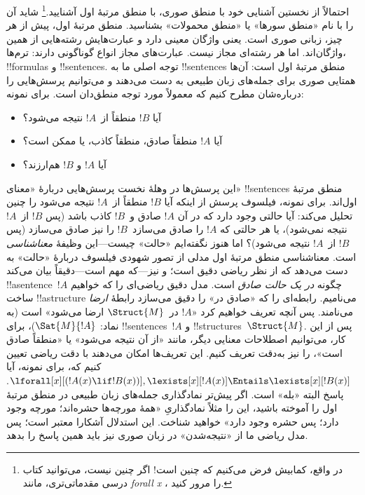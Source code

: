 \documentclass[../../../include/open-logic-section]{subfiles}
\begin{document}


احتمالاً از نخستین آشنایی خود با منطق صوری، با منطق مرتبهٔ اول
آشنایید.\footnote{در واقع، کمابیش فرض می‌کنیم که چنین است!{} اگر چنین
نیست، می‌توانید کتاب درسی مقدماتی‌تری، مانند \emph{forall x}
\citep{Magnus2021}، را مرور کنید.} شاید آن را با نام «منطق سورها» یا
«منطق محمولات» بشناسید. منطق مرتبهٔ اول، پیش از هر چیز، زبانی صوری
است. یعنی واژگان معینی دارد و عبارت‌هایش رشته‌هایی از همین واژگان‌اند.
اما هر رشته‌ای مجاز نیست. عبارت‌های مجاز انواع گوناگونی دارند: ترم‌ها،
!!{formula}s و !!{sentence}s. توجه اصلی ما به !!{sentence}s منطق مرتبهٔ
اول است: آن‌ها همتایی صوری برای جمله‌های زبان طبیعی به دست می‌دهند و
می‌توانیم پرسش‌هایی را درباره‌شان مطرح کنیم که معمولاً مورد توجه منطق‌دان
است. برای نمونه:
\begin{itemize}
    \item آیا $!B$ منطقاً از~$!A$ نتیجه می‌شود؟
    \item آیا $!A$ منطقاً صادق، منطقاً کاذب، یا ممکن است؟
    \item آیا $!A$ و $!B$ هم‌ارزند؟
\end{itemize}

این پرسش‌ها در وهلهٔ نخست پرسش‌هایی دربارهٔ «معنای» !!{sentence}s منطق
مرتبهٔ اول‌اند. برای نمونه، فیلسوف پرسش از اینکه آیا $!B$ منطقاً
از~$!A$ نتیجه می‌شود را چنین تحلیل می‌کند: آیا حالتی وجود دارد که در آن
$!A$ صادق و~$!B$ کاذب باشد (پس $!B$ از~$!A$ نتیجه نمی‌شود)، یا هر حالتی
که $!A$ را صادق می‌سازد~$!B$ را نیز صادق می‌سازد (پس $!B$ از~$!A$
نتیجه می‌شود)؟ اما هنوز نگفته‌ایم «حالت» چیست---این وظیفهٔ
\emph{معناشناسی} است. معناشناسی منطق مرتبهٔ اول مدلی از تصور شهودی
فیلسوف دربارهٔ «حالت» به دست می‌دهد که از نظر ریاضی دقیق است؛ و نیز---که
مهم است---دقیقاً بیان می‌کند !!a{sentence}~$!A$ چگونه \emph{در یک حالت
صادق} است. مدل دقیق ریاضی‌ای را که خواهیم ساخت !!a{structure} می‌نامیم.
رابطه‌ای را که «صادق در» را دقیق می‌سازد رابطهٔ \emph{ارضا} می‌نامند.
پس آنچه تعریف خواهیم کرد «$!A$ در~$\Struct{M}$ ارضا می‌شود» است (به
نماد: $\Sat{M}{!A}$)، برای !!{sentence}s~$!A$ و
!!{structure}s~$\Struct{M}$. پس از این کار، می‌توانیم اصطلاحات معنایی
دیگر، مانند «از آن نتیجه می‌شود» یا «منطقاً صادق است»، را نیز به‌دقت
تعریف کنیم. این تعریف‌ها امکان می‌دهند با دقت ریاضی تعیین کنیم که، برای
نمونه، آیا
$\lforall[x][(!A(x) \lif !B(x))],
\lexists[x][!A(x)] \Entails \lexists[x][!B(x)]$. پاسخ البته «بله» است.
اگر پیش‌تر نمادگذاری جمله‌های زبان طبیعی در منطق مرتبهٔ اول را آموخته
باشید، این را مثلاً نمادگذاریِ «همهٔ مورچه‌ها حشره‌اند؛ مورچه وجود دارد؛
پس حشره وجود دارد» خواهید شناخت. این استدلال آشکارا معتبر است؛ پس مدل
ریاضی ما از «نتیجه‌شدن» در زبان صوری نیز باید همین پاسخ را بدهد.
\end{document}
